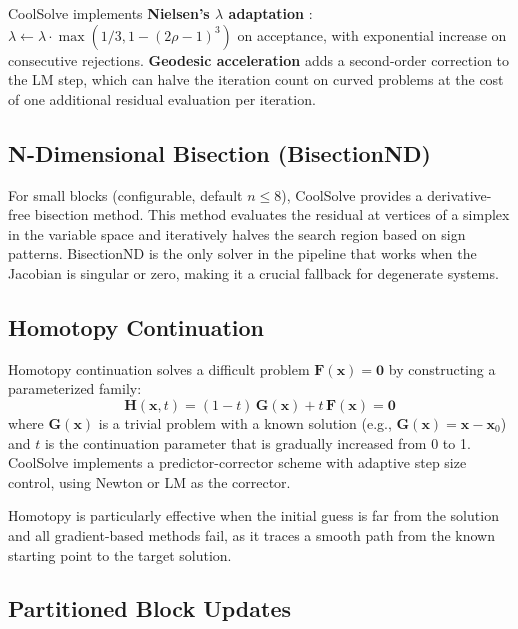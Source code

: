 \documentclass[review,3p]{elsarticle}
\begin{document}
CoolSolve implements \textbf{Nielsen's $\lambda$ adaptation} \cite{Madsen2004}: $\lambda \leftarrow \lambda \cdot \max(1/3, 1 - (2\rho - 1)^3)$ on acceptance, with exponential increase on consecutive rejections. \textbf{Geodesic acceleration} \cite{Transtrum2012} adds a second-order correction to the LM step, which can halve the iteration count on curved problems at the cost of one additional residual evaluation per iteration.

\subsection{N-Dimensional Bisection (BisectionND)}

For small blocks (configurable, default $n \leq 8$), CoolSolve provides a derivative-free bisection method. This method evaluates the residual at vertices of a simplex in the variable space and iteratively halves the search region based on sign patterns. BisectionND is the only solver in the pipeline that works when the Jacobian is singular or zero, making it a crucial fallback for degenerate systems.

\subsection{Homotopy Continuation}

Homotopy continuation solves a difficult problem $\mathbf{F}(\mathbf{x}) = \mathbf{0}$ by constructing a parameterized family:
\begin{equation}
    \mathbf{H}(\mathbf{x}, t) = (1 - t)\,\mathbf{G}(\mathbf{x}) + t\,\mathbf{F}(\mathbf{x}) = \mathbf{0}
\end{equation}
where $\mathbf{G}(\mathbf{x})$ is a trivial problem with a known solution (e.g., $\mathbf{G}(\mathbf{x}) = \mathbf{x} - \mathbf{x}_0$) and $t$ is the continuation parameter that is gradually increased from 0 to 1. CoolSolve implements a predictor-corrector scheme with adaptive step size control, using Newton or LM as the corrector.

Homotopy is particularly effective when the initial guess is far from the solution and all gradient-based methods fail, as it traces a smooth path from the known starting point to the target solution.

\subsection{Partitioned Block Updates}
\end{document}
